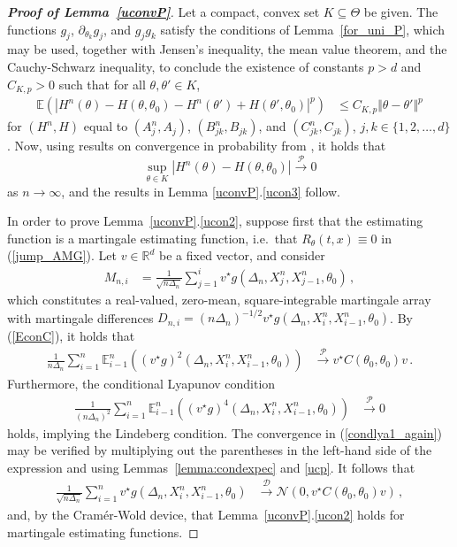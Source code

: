 \documentclass[11pt,a4paper]{article}
\newcommand{\xtl}{{X^n_{i-1}}}
\newcommand{\xtr}{X^n_i}
\newcommand{\xtlj}{{X^n_{j-1}}}
\newcommand{\xtrj}{X^n_j}
\newcommand{\thetan}{{\theta_0}}
\newcommand{\thetak}{{\theta_k}}
\newcommand{\EE}{{\mathbb E}}
\newcommand{\RR}{{\mathbb R}}
\newcommand{\dd}{{\mathcal{D}}}
\newcommand{\nn}{{\mathcal{N}}}
\newcommand{\pp}{{\mathcal{P}}}
\numberwithin{equation}{section}
\numberwithin{theorem}{section}
\begin{document}
\begin{proof}[\textbf{Proof of Lemma~\ref{uconvP}}]
%
Let a compact, convex set $K\subseteq \Theta$ be given. The functions $g_j$, $\partial_\thetak g_j$, and $g_jg_k$ satisfy the conditions of Lemma~\ref{for_uni_P}, which may be used, together with Jensen's inequality, the mean value theorem, and the Cauchy-Schwarz inequality, to conclude the existence of constants $p>d$ and $C_{K,p}>0$ such that for all $\theta, \theta' \in K$,
\begin{align*}
  \EE\left( \left|H^n(\theta) - H(\theta, \thetan) - H^n(\theta') +  H(\theta', \thetan)\right|^p\right)
  & \leq C_{K,p} \Vert\theta-\theta'\Vert^p
\end{align*}
%
for $(H^n, H)$ equal to $(A_j^n, A_j)$, $(B_{jk}^n, B_{jk})$, and $(C_{jk}^n, C_{jk})$, $j,k \in \{1, 2,\ldots, d\}$. Now, using results on convergence in probability from \cite[Chapter 14]{kallenberg1997}, it holds that 
\[
\sup_{\theta \in K}\left\vert H^n(\theta) - H(\theta, \thetan)\right\vert \overset{\pp}{\longrightarrow} 0
\]
%
as $n\to \infty$, and the results in Lemma \ref{uconvP}.\ref{ucon3} follow. \medskip

In order to prove Lemma~\ref{uconvP}.\ref{ucon2}, suppose first that the estimating function is a martingale estimating function, i.e.\ that $R_\theta(t,x) \equiv 0$ in (\ref{jump_AMG}). Let $v\in \RR^d$ be a fixed vector, and consider
\begin{align}
M_{n,i} &= \frac{1}{\sqrt{n\Delta_n}} \sum_{j=1}^i v^\star g(\Delta_n,\xtrj,\xtlj, \thetan)\,,
\label{M1}
\end{align}
%
which constitutes a real-valued, zero\--mean, square\--integrable martingale array with martingale differences $D_{n,i} =(n\Delta_n)^{-1/2} v^\star g(\Delta_n,\xtr,\xtl, \thetan)$. By (\ref{EconC}), it holds that
\begin{align*}
\frac{1}{n\Delta_n} \sum_{i=1}^n \EE^n_{i-1}\left( (v^\star g)^2(\Delta_n,\xtr,\xtl, \thetan) \right) &\overset{\pp}{\longrightarrow} v^\star  C(\thetan,\thetan) v\,.
\end{align*}
%
Furthermore, the conditional Lyapunov condition
\begin{align}
\frac{1}{(n\Delta_n)^2} \sum_{i=1}^n \EE^n_{i-1}\left( (v^\star g)^4(\Delta_n,\xtr,\xtl, \thetan) \right) &\overset{\pp}{\longrightarrow} 0
\label{condlya1_again}
\end{align}
%
holds, implying the Lindeberg condition. The convergence in (\ref{condlya1_again}) may be verified by multiplying out the parentheses in the left-hand side of the expression and using Lemmas~\ref{lemma:condexpec} and \ref{ucp}. It follows that  
\begin{align*}
\frac{1}{\sqrt{n\Delta_n}} \sum_{i=1}^n v^\star  g(\Delta_n,\xtr,\xtl, \thetan)&\overset{\dd}{\longrightarrow} \nn\left(0,v^\star  C(\thetan,\thetan) v\right)\,,
\end{align*}
%
and, by the Cram\'{e}r-Wold device, that Lemma~\ref{uconvP}.\ref{ucon2} holds for martingale estimating functions. \medskip 


\end{proof}
\end{document}
